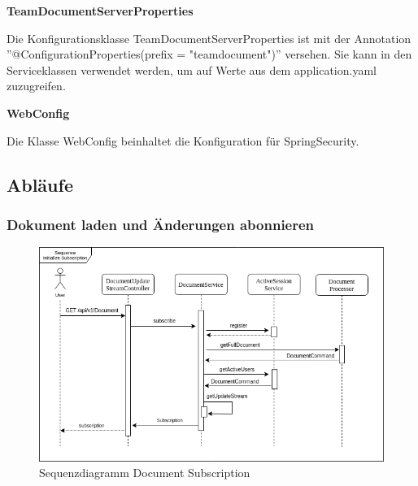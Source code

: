 \textbf{TeamDocumentServerProperties}

Die Konfigurationsklasse TeamDocumentServerProperties ist mit der Annotation ''@ConfigurationProperties(prefix = "teamdocument")'' versehen.
Sie kann in den Serviceklassen verwendet werden, um auf Werte aus dem application.yaml zuzugreifen.

\textbf{WebConfig}

Die Klasse WebConfig beinhaltet die Konfiguration für SpringSecurity.

\clearpage

\subsection{Abläufe}

\subsubsection{Dokument laden und Änderungen abonnieren}

\begin{figure}[h]
    \centering
    \begin{minipage}[b]{1\textwidth}
        \includegraphics[width=\textwidth]{images/seq_init_subscription.drawio}
        \caption{Sequenzdiagramm Document Subscription}
    \end{minipage}\label{fig:figureseqsub}
\end{figure}


